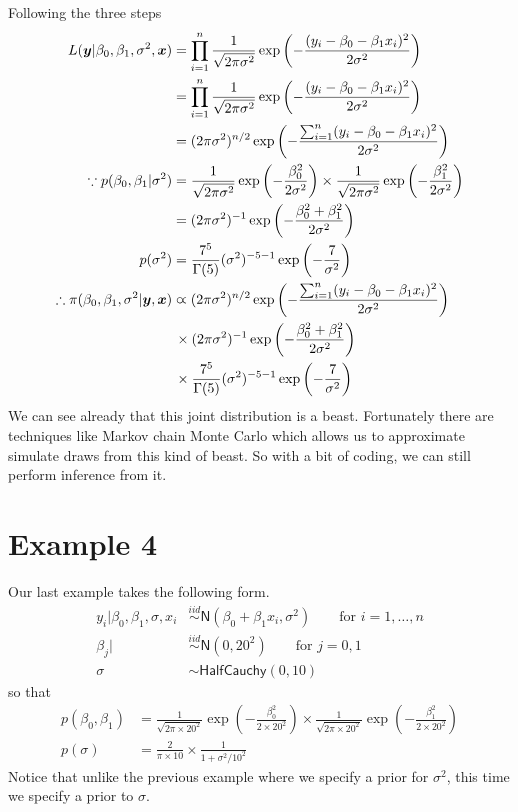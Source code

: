 \documentclass{article}
\begin{document}
Following the three steps
\[
\begin{split}
L(\boldsymbol{y}|\beta_0,\beta_1,\sigma^2,\boldsymbol{x})&=\prod_{i=1}^n\frac{1}{\sqrt{2\pi\sigma^2}}\exp\left(-\frac{(y_i-\beta_0-\beta_1x_i)^2}{2\sigma^2}\right)\\
&=\prod_{i=1}^n\frac{1}{\sqrt{2\pi\sigma^2}}\exp\left(-\frac{(y_i-\beta_0-\beta_1x_i)^2}{2\sigma^2}\right)\\
&=(2\pi\sigma^2)^{n/2}\exp\left(-\frac{\sum_{i=1}^n(y_i-\beta_0-\beta_1x_i)^2}{2\sigma^2}\right)\\
\because p(\beta_0,\beta_1|\sigma^2)&=\frac{1}{\sqrt{2\pi\sigma^2}}\exp\left(-\frac{\beta_0^2}{2\sigma^2}\right)\times\frac{1}{\sqrt{2\pi\sigma^2}}\exp\left(-\frac{\beta_1^2}{2\sigma^2}\right)\\
&=(2\pi\sigma^2)^{-1}\exp\left(-\frac{\beta_0^2+\beta_1^2}{2\sigma^2}\right)\\
p(\sigma^2)&=\frac{7^5}{\Gamma(5)}(\sigma^2)^{-5-1}\exp\left(-\frac{7}{\sigma^2}\right)\\
\therefore \pi(\beta_0,\beta_1,\sigma^2|\boldsymbol{y},\boldsymbol{x})&\varpropto(2\pi\sigma^2)^{n/2}\exp\left(-\frac{\sum_{i=1}^n(y_i-\beta_0-\beta_1x_i)^2}{2\sigma^2}\right)\\
&\,\times(2\pi\sigma^2)^{-1}\exp\left(-\frac{\beta_0^2+\beta_1^2}{2\sigma^2}\right)\\
&\,\times\frac{7^5}{\Gamma(5)}(\sigma^2)^{-5-1}\exp\left(-\frac{7}{\sigma^2}\right)
\end{split}
\]
We can see already that this joint distribution is a beast. Fortunately there are techniques like Markov chain Monte Carlo which allows us to approximate simulate draws from this kind of beast. So with a bit of coding, we can still perform inference from it.

\section*{Example 4}
Our last example takes the following form.
\[
\begin{split}
y_i|\beta_0,\beta_1,\sigma,x_i&\overset{iid}{\sim}\mathsf{N}(\beta_0+\beta_1x_i,\sigma^2)\qquad\mbox{for }i=1,\ldots,n\\
\beta_j|&\overset{iid}{\sim}\mathsf{N}(0,20^2)\qquad\mbox{for }j=0,1\\
\sigma&\sim\mathsf{HalfCauchy}(0,10)
\end{split}
\]
so that
\[
\begin{split}
p(\beta_0,\beta_1)&=\frac{1}{\sqrt{2\pi \times 20^2}}\exp\left(-\frac{\beta_0^2}{2\times 20^2}\right)\times \frac{1}{\sqrt{2\pi \times 20^2}}\exp\left(-\frac{\beta_1^2}{2\times 20^2}\right)\\
p(\sigma)&=\frac{2}{\pi\times 10}\times\frac{1}{1+\sigma^2/10^2}
\end{split}
\]
Notice that unlike the previous example where we specify a prior for $\sigma^2$, this time we specify a prior to $\sigma$.
\end{document}
